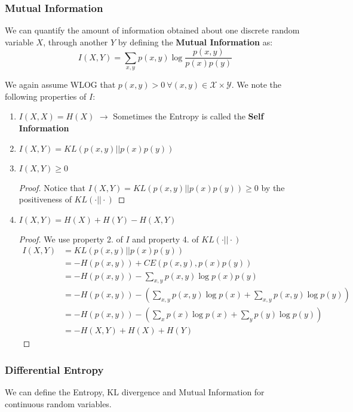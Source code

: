 \documentclass[]{article}
\theoremstyle{mattstyle}
\theoremstyle{definition}
\begin{document}
\subsubsection{Mutual Information}
We can quantify the amount of information obtained about one discrete random variable $X$, through another $Y$ by defining the \textbf{Mutual Information} as:
\begin{equation}
I(X,Y)=\sum_{x,y}p(x,y)\log\frac{p(x,y)}{p(x)p(y)}
\end{equation}

We again assume WLOG that \(p(x,y)>0 \ \forall (x,y)\in\mathcal{X}\times\mathcal{Y}\). We note the following properties of $I$:

\begin{enumerate}
	\item \(I(X,X) = H(X)\) \(\rightarrow\) Sometimes the Entropy is called the \textbf{Self Information}
	\item $I(X,Y) = KL(p(x,y)||p(x)p(y))$
	\item \(I(X,Y)\ge 0\)
	\begin{proof}
		Notice that \(I(X,Y) = KL(p(x,y)||p(x)p(y)) \ge 0\) by the positiveness of \(KL(\cdot||\cdot)\)
	\end{proof}
	\item $I(X,Y) = H(X) + H(Y) -H(X,Y)$
	\begin{proof} We use property 2. of $I$ and property 4. of \(KL(\cdot||\cdot)\)
		\begin{align*}
		I(X,Y) &= KL(p(x,y)||p(x)p(y)) \\
		&= -H(p(x,y)) + CE(p(x,y),p(x)p(y)) \\
		&= -H(p(x,y)) - \sum_{x,y}p(x,y)\log p(x)p(y)\\
		&= -H(p(x,y)) - \left(\sum_{x,y}p(x,y)\log p(x) + \sum_{x,y}p(x,y)\log p(y)\right)\\
		&=-H(p(x,y)) - \left(\sum_{x}p(x)\log p(x) + \sum_{y}p(y)\log p(y)\right)\\
		&= -H(X,Y) + H(X) + H(Y)
		\end{align*}
	\end{proof}
	
\end{enumerate}

\subsubsection{Differential Entropy}
We can define the Entropy, KL divergence and Mutual Information for continuous random variables.
\end{document}
